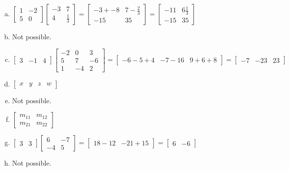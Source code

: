\documentclass[11pt]{article}
\begin{document}
\begin{enumerate}[a.]
	\item %
	$\begin{bmatrix}
		1 & -2 \\
		5 & 0
	\end{bmatrix}
	\begin{bmatrix}
		-3 & 7 \\
		4 & \frac{1}{3}
	\end{bmatrix}=
	\begin{bmatrix}
		-3+-8 & 7-\frac{2}{3} \\
		-15 & 35
	\end{bmatrix}=
	\begin{bmatrix}
		-11 & 6\frac{1}{3} \\
		-15 & 35
	\end{bmatrix}$
	\item %
	Not possible.
	\item %
	$\begin{bmatrix}
		3 & -1 & 4
	\end{bmatrix}
	\begin{bmatrix}
		-2 & 0 & 3 \\
		5 & 7 & -6 \\
		1 & -4 & 2
	\end{bmatrix}=
	\begin{bmatrix}
		-6-5+4 & -7-16 & 9+6+8
	\end{bmatrix}=
	\begin{bmatrix}
		-7 & -23 & 23
	\end{bmatrix}
	$
	\item %
	$\begin{bmatrix}
		x & y & z & w
	\end{bmatrix}$
	\item %
	Not possible.
	\item %
	$\begin{bmatrix}
		m_{11} & m_{12} \\
		m_{21} & m_{22}
	\end{bmatrix}$
	\item %
	$\begin{bmatrix}
		3 & 3
	\end{bmatrix}
	\begin{bmatrix}
		6 & -7 \\
		-4 & 5
	\end{bmatrix}=
	\begin{bmatrix}
		18-12 & -21+15
	\end{bmatrix}=
	\begin{bmatrix}
		6 & -6
	\end{bmatrix}			
	$
	\item %
	Not possible.
\end{enumerate}
\end{document}
